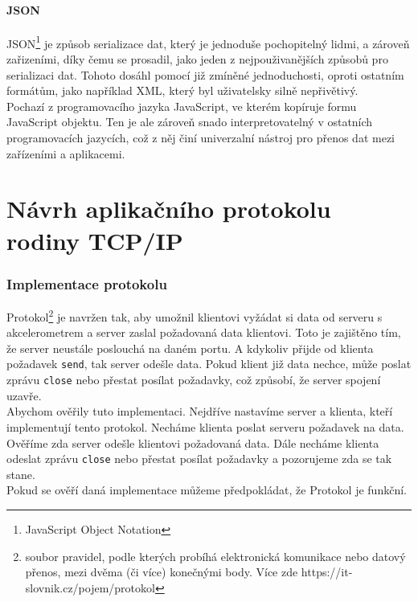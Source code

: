 \documentclass[12pt]{report}			%
\begin{document}
				\subsection{JSON}
JSON\footnote{JavaScript Object Notation} je způsob serializace dat, který je jednoduše pochopitelný lidmi, a zároveň zařizeními, díky čemu se prosadil, jako jeden z nejpouživanějších způsobů pro serializaci dat. Tohoto dosáhl pomocí již zmíněné jednoduchosti, oproti ostatním formátům, jako například XML, který byl uživatelsky silně nepřivětivý. 
\\
Pochazí z programovacího jazyka JavaScript, ve kterém kopíruje formu JavaScript objektu. Ten je ale zároveň snado interpretovatelný v ostatních programovacích jazycích, což z něj činí univerzalní nástroj pro přenos dat mezi zařízeními a aplikacemi. \cite{JSON1}\cite{JSON2}\cite{JSON3}\cite{JSON4}


			

	\part{Návrh aplikačního protokolu rodiny TCP/IP}



\section{Implementace protokolu}
Protokol\footnote{soubor pravidel, podle kterých probíhá elektronická komunikace nebo datový přenos, mezi dvěma (či více) konečnými body. Více zde https://it-slovnik.cz/pojem/protokol} 
je navržen tak, aby umožnil klientovi vyžádat si data od serveru s akcelerometrem a server zaslal požadovaná data klientovi. Toto je zajištěno tím, že server neustále poslouchá na daném portu. A kdykoliv přijde od klienta požadavek \texttt{send}, tak server odešle data. Pokud klient již data nechce, může poslat zprávu \texttt{close} nebo přestat posílat požadavky, což způsobí, že server spojení uzavře.
\\
Abychom ověřily tuto implementaci. Nejdříve nastavíme server a klienta, kteří implementují tento protokol. Necháme klienta poslat serveru požadavek na data. Ověříme zda server odešle klientovi požadovaná data. Dále necháme klienta odeslat zprávu \texttt{close} nebo přestat posílat požadavky a pozorujeme zda se tak stane.
\\
Pokud se ověří daná implementace můžeme předpokládat, že Protokol je funkční.
\\
\end{document}
